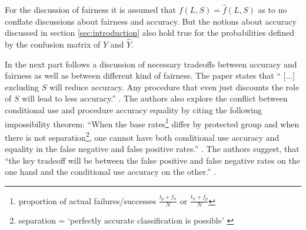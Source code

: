 
For the discussion of fairness it is assumed that $f(L,S) = \hat{f}(L,S)$ as to no 
conflate discussions about fairness and accuracy. But the notions about accuracy discussed 
in section \ref{sec:introduction} also hold true for the probabilities defined by the
confusion matrix of $Y$ and $\hat{Y}$. 

In the next part follows a discussion of necessary tradeoffs between accuracy and 
fairness as well as between different kind of fairness. The paper states that \enquote{
[...] excluding $S$ will reduce accuracy. Any procedure that even just discounts the role 
of $S$ will lead to less accuracy.} \cite{Berk.2018}. The authors also explore the conflict 
between conditional use and procedure accuracy equality by citing the following impossibility 
theorem: \enquote{When the base rates\footnote{ proportion of actual failures/successes 
$\frac{t_p + f_n}{N}$ or $\frac{t_n + f_p}{N}$} differ by protected group and when there 
is not separation\footnote{ separation = \enquote{perfectly accurate classification is
possible} \cite{Berk.2018}}, one cannot have both conditional use accuracy and equality in 
the false negative and false positive rates.} \cite{Chouldechova2017FairPW, 
DBLP:journals/corr/KleinbergMR16}. The authors suggest, that \enquote{the key tradeoff will be 
between the false positive and false negative rates on the one hand and the conditional use 
accuracy on the other.} \cite{Berk.2018}.

